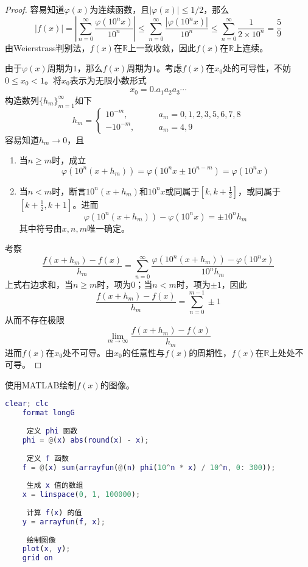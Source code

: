 \documentclass[lang = cn, scheme = chinese, thmcnt = section]{elegantbook}
\newcommand{\R}{\mathbb{R}}            %
\begin{document}
\begin{proof}
	容易知道$\varphi(x)$为连续函数，且$|\varphi(x)|\le1/2$，那么
	$$
	|f(x)|
	=\left| \sum_{n=0}^{\infty}\frac{\varphi(10^nx)}{10^n} \right|
	\le\sum_{n=0}^{\infty}\frac{|\varphi(10^nx)|}{10^n}
	\le\sum_{n=0}^{\infty}\frac{1}{2\times 10^n}
	=\frac{5}{9}
	$$
	由Weierstrass判别法，$f(x)$在$\R$上一致收敛，因此$f(x)$在$\R$​上连续。
	
	由于$\varphi(x)$周期为$1$，那么$f(x)$周期为$1$。考虑$f(x)$在$x_0$处的可导性，不妨$0\le x_0<1$。将$x_0$表示为无限小数形式
	$$
	x_0=0.a_1a_2a_3\cdots
	$$
	构造数列$\{h_m\}_{m=1}^{\infty}$如下
	$$
	h_m=\begin{cases}
		10^{-m},\qquad & a_m=0,1,2,3,5,6,7,8\\
		-10^{-m},\qquad & a_m=4,9
	\end{cases}
	$$
	容易知道$h_m\to 0$​，且
	
	\begin{enumerate}
		\item 当$n\ge m$时，成立
		$$
		\varphi(10^n(x+h_m))=\varphi(10^nx\pm 10^{n-m})=\varphi(10^nx)
		$$
		\item 当$n<m$时，断言$10^n(x+h_m)$和$10^nx$或同属于$\left[k,k+\frac{1}{2}\right]$，或同属于$\left[k+\frac{1}{2},k+1\right]$。进而
		$$
		\varphi(10^n(x+h_m))-\varphi(10^nx)=\pm 10^n h_m
		$$
		其中符号由$x,n,m$唯一确定。
	\end{enumerate}
	
	考察
	$$
	\frac{f(x+h_m)-f(x)}{h_m}=\sum_{n=0}^{\infty}\frac{\varphi(10^n(x+h_m))-\varphi(10^nx)}{10^nh_m}
	$$
	上式右边求和，当$n\ge m$时，项为$0$；当$n<m$时，项为$\pm 1$，因此
	$$
	\frac{f(x+h_m)-f(x)}{h_m}=\sum_{n=0}^{m-1}\pm1
	$$
	从而不存在极限
	$$
	\lim_{m\to\infty}\frac{f(x+h_m)-f(x)}{h_m}
	$$
	进而$f(x)$在$x_0$处不可导。由$x_0$的任意性与$f(x)$的周期性，$f(x)$在$\R$上处处不可导。
\end{proof}

使用MATLAB绘制$f(x)$的图像。

\begin{lstlisting}[language = Matlab]
	clear; clc
	format longG
	
	 定义 phi 函数
	phi = @(x) abs(round(x) - x);
	
	 定义 f 函数
	f = @(x) sum(arrayfun(@(n) phi(10^n * x) / 10^n, 0: 300));
	
	 生成 x 值的数组
	x = linspace(0, 1, 100000);
	
	 计算 f(x) 的值
	y = arrayfun(f, x);
	
	 绘制图像
	plot(x, y);
	grid on
\end{lstlisting}
\end{document}
